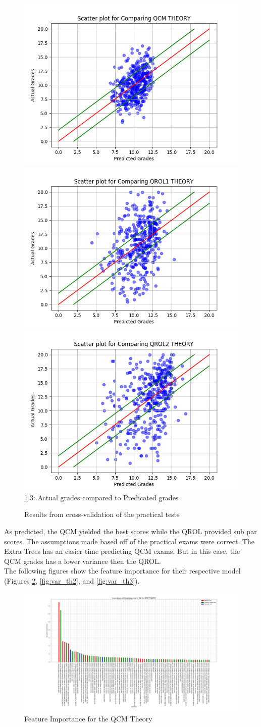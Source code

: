 \documentclass[a4paper,11pt]{report}
\numberwithin{figure}{section} %
\begin{document}
\begin{figure}[H]
      \includegraphics[width=.30\linewidth]{plots/cv_comp_QCM_THEORY_2018-04-30_13_57_05.png}
      \includegraphics[width=.30\linewidth]{plots/cv_comp_QROL1_THEORY_2018-04-30_13_40_50.png}
  	  \includegraphics[width=.30\linewidth]{plots/cv_comp_QROL2_THEORY_2018-04-30_13_12_52.png}
      \\
      \ref{fig:results_theo}.3: Actual grades compared to Predicated grades
      \caption{Results from cross-validation of the practical tests}
      \label{fig:results_theo}
    \end{figure}

    As predicted, the QCM yielded the best scores while the QROL provided sub par scores.
    The assumptions made based off of the practical exams were correct.
    The Extra Trees has an easier time predicting QCM exams.
    But in this case, the QCM grades has a lower variance then the QROL.\\


    The following figures show the feature importance for their respective model (Figures \ref{fig:var_th1}, \ref{fig:var_th2}, and \ref{fig:var_th3}).

     \begin{figure}[H]
      \centering
      \includegraphics[width=.95\linewidth]{plots/var_importance_QCM_THEORY_2018-05-02_20_53_18.png}
      \caption{Feature Importance for the QCM Theory}
      \label{fig:var_th1}
      \end{figure}
\end{document}

